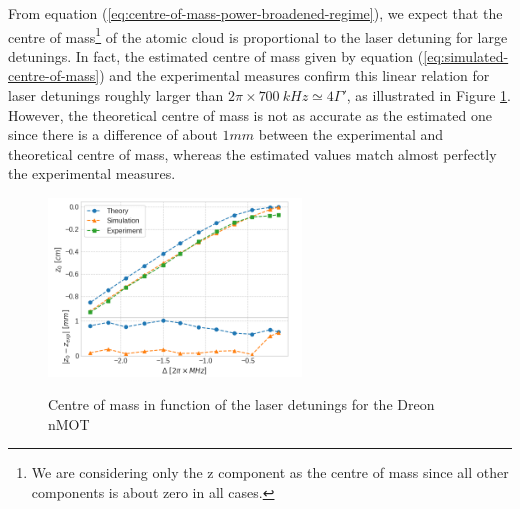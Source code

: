 From equation (\ref{eq:centre-of-mass-power-broadened-regime}), we expect that the centre of mass\footnote{We are considering only the z component as the centre of mass since all other components is about zero in all cases.} of the atomic cloud is proportional to the laser detuning for large detunings. In fact, the estimated centre of mass given by equation (\ref{eq:simulated-centre-of-mass}) and the experimental measures confirm this linear relation for laser detunings roughly larger than $ 2\pi \times 700\ kHz \simeq 4\Gamma' $, as illustrated in Figure \ref{fig:Dreon-centre-of-mass}. However, the theoretical centre of mass is not as accurate as the estimated one since there is a difference of about $1mm$ between the experimental and theoretical centre of mass, whereas the estimated values match almost perfectly the experimental measures.

\begin{figure}[!ht]
    \centering
    \caption{Centre of mass in function of the laser detunings for the Dreon nMOT}
    \includegraphics[width=0.6\textwidth]{USPSC-img/dy_centre_of_mass.png}
    \vspace{5px}
    \label{fig:Dreon-centre-of-mass}
\end{figure}

